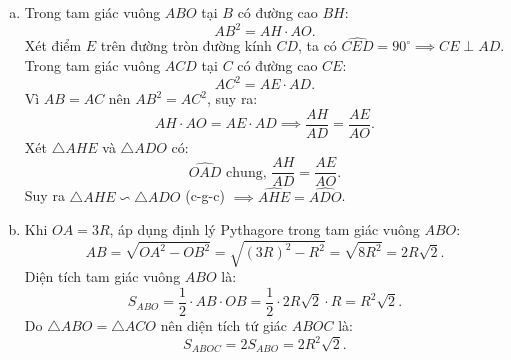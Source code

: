 \begin{bt}
{\begin{enumerate}[a)]
    Ta có $AB = AC$ và $OB = OC = R$, nên $OA$ là đường trung trực của $BC$, suy ra $OA \perp BC$ tại $H$.\\
    Mặt khác, $CD$ là đường kính của $(O)$ nên $\widehat{DBC} = 90^\circ \implies BD \perp BC$.\\
    Từ $OA \perp BC$ và $BD \perp BC$ suy ra $BD \parallel OA$.
    \item Trong tam giác vuông $ABO$ tại $B$ có đường cao $BH$:
    $$AB^2 = AH \cdot AO.$$
    Xét điểm $E$ trên đường tròn đường kính $CD$, ta có $\widehat{CED} = 90^\circ \implies CE \perp AD$.\\
    Trong tam giác vuông $ACD$ tại $C$ có đường cao $CE$:
    $$AC^2 = AE \cdot AD.$$
    Vì $AB = AC$ nên $AB^2 = AC^2$, suy ra:
    $$AH \cdot AO = AE \cdot AD \implies \dfrac{AH}{AD} = \dfrac{AE}{AO}.$$
    Xét $\triangle AHE$ và $\triangle ADO$ có:
    $$\widehat{OAD}\text{ chung, } \dfrac{AH}{AD} = \dfrac{AE}{AO}.$$
    Suy ra $\triangle AHE \backsim \triangle ADO$ (c-g-c) $\implies \widehat{AHE} = \widehat{ADO}$.
    \item Khi $OA = 3R$, áp dụng định lý Pythagore trong tam giác vuông $ABO$:
    $$AB = \sqrt{OA^2 - OB^2} = \sqrt{(3R)^2 - R^2} = \sqrt{8R^2} = 2R\sqrt{2}.$$
    Diện tích tam giác vuông $ABO$ là:
    $$S_{ABO} = \dfrac{1}{2} \cdot AB \cdot OB = \dfrac{1}{2} \cdot 2R\sqrt{2} \cdot R = R^2\sqrt{2}.$$
    Do $\triangle ABO = \triangle ACO$ nên diện tích tứ giác $ABOC$ là:
    $$S_{ABOC} = 2S_{ABO} = 2R^2\sqrt{2}.$$
\end{enumerate}
}
\end{bt}


